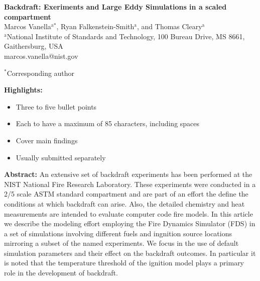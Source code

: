 \documentclass[12pt,letterpaper]{article}
\begin{document}
\begin{flushleft} %

\textbf{Backdraft: Exeriments and Large Eddy Simulations in a scaled compartment}
\vspace{3mm}\\
%
Marcos Vanella$^\text{a*}$, Ryan Falkenstein-Smith$^\text{a}$, and Thomas Cleary$^\text{a}$
\vspace{3mm}\\	

$^\text{a}$National Institute of Standards and Technology, 100 Bureau Drive, MS 8661, Gaithersburg, USA  \\
marcos.vanella@nist.gov
\vspace{3mm}

$^*$Corresponding author

\textbf{Highlights:}	
\begin{itemize}
	\itemsep-4pt %
	\item Three to five bullet points
	\item Each to have a maximum of 85 characters, including spaces
	\item Cover main findings
	\item Usually submitted separately
\end{itemize}
\vspace{3mm}

\textbf{Abstract:}
\vspace{3mm}
An extensive set of backdraft experiments has been performed at the NIST National Fire Research Laboratory. These experiments were conducted in a 2/5 scale ASTM standard compartment and are part of an effort the define the conditions at which backdraft can arise. Also, the detailed chemistry and heat measurements are intended to evaluate computer code fire models. In this article we describe the modeling effort employing the Fire Dynamics Simulator (FDS) in a set of simulations involving different fuels and ingnition source locations mirroring a subset of the named experiments. We focus in the use of default simulation parameters and their effect on the backdraft outcomes. In particular it is noted that the temperature threshold of the ignition model plays a primary role in the development of backdraft.


\end{flushleft}
\end{document}
